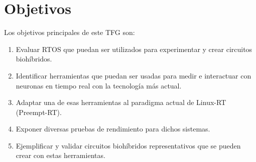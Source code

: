 \section{Objetivos\label{SEC:OBJETIVOS}}


Los objetivos principales de este TFG son:

\begin{enumerate}
    \item Evaluar RTOS que puedan ser utilizados para experimentar y crear circuitos biohíbridos.
    \item Identificar herramientas que puedan ser usadas para medir e interactuar con neuronas en tiempo real con la tecnología más actual.
    \item Adaptar una de esas herramientas al paradigma actual de Linux-RT (Preempt-RT).
    \item Exponer diversas pruebas de rendimiento para dichos sistemas.
    \item Ejemplificar y validar circuitos biohíbridos representativos que se pueden crear con estas herramientas.
\end{enumerate}
